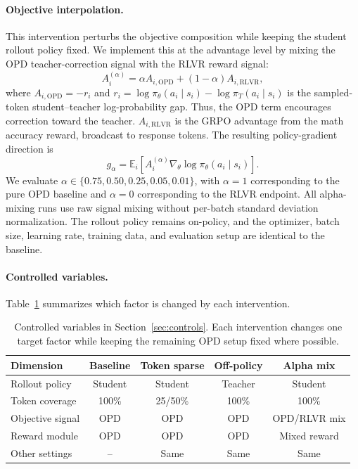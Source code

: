 \paragraph{Objective interpolation.}
This intervention perturbs the objective composition while keeping the
student rollout policy fixed. We implement this at the advantage level by
mixing the OPD teacher-correction signal with the RLVR reward signal:
\begin{equation}
    A_i^{(\alpha)}
    =
    \alpha A_{i,\mathrm{OPD}}
    +
    (1-\alpha)A_{i,\mathrm{RLVR}},
    \label{eq:alpha-mixed-advantage}
\end{equation}
where $A_{i,\mathrm{OPD}}=-r_i$ and
$r_i=\log\pi_\theta(a_i\mid s_i)-\log\pi_T(a_i\mid s_i)$ is the
sampled-token student--teacher log-probability gap. Thus, the OPD term
encourages correction toward the teacher. $A_{i,\mathrm{RLVR}}$ is the
GRPO advantage from the math accuracy reward, broadcast to response tokens.
The resulting policy-gradient direction is
\begin{equation}
    g_{\alpha}
    =
    \mathbb{E}_i
    \left[
    A_i^{(\alpha)}
    \nabla_\theta
    \log \pi_\theta(a_i\mid s_i)
    \right].
    \label{eq:alpha-mixed-gradient}
\end{equation}
We evaluate
$\alpha\in\{0.75,0.50,0.25,0.05,0.01\}$, with $\alpha=1$ corresponding
to the pure OPD baseline and $\alpha=0$ corresponding to the RLVR endpoint.
All alpha-mixing runs use raw signal mixing without per-batch standard
deviation normalization. The rollout policy remains on-policy, and the
optimizer, batch size, learning rate, training data, and evaluation setup
are identical to the baseline.

\paragraph{Controlled variables.}
Table~\ref{tab:control-variables} summarizes which factor is changed by
each intervention.

\begin{table}[h]
\centering
\begin{tabular}{lcccc}
\toprule
Dimension & Baseline & Token sparse & Off-policy & Alpha mix \\
\midrule
Rollout policy & Student & Student & Teacher & Student \\
Token coverage & 100\% & 25/50\% & 100\% & 100\% \\
Objective signal & OPD & OPD & OPD & OPD/RLVR mix \\
Reward module & OPD & OPD & OPD & Mixed reward \\
Other settings & -- & Same & Same & Same \\
\bottomrule
\end{tabular}
\caption{
Controlled variables in Section~\ref{sec:controls}. Each intervention
changes one target factor while keeping the remaining OPD setup fixed where
possible.
}
\label{tab:control-variables}
\end{table}

